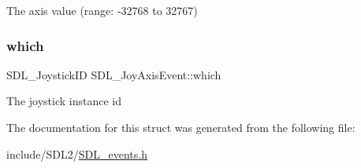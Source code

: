 The axis value (range\+: -\/32768 to 32767) \mbox{\label{struct_s_d_l___joy_axis_event_a965719f4703a7091bcc5f07f79fcf7e1}} 
\subsubsection{\texorpdfstring{which}{which}}
{\footnotesize\ttfamily S\+D\+L\+\_\+\+Joystick\+ID S\+D\+L\+\_\+\+Joy\+Axis\+Event\+::which}

The joystick instance id 

The documentation for this struct was generated from the following file\+:\begin{DoxyCompactItemize}
\item 
include/\+S\+D\+L2/\hyperlink{_s_d_l__events_8h}{S\+D\+L\+\_\+events.\+h}\end{DoxyCompactItemize}
